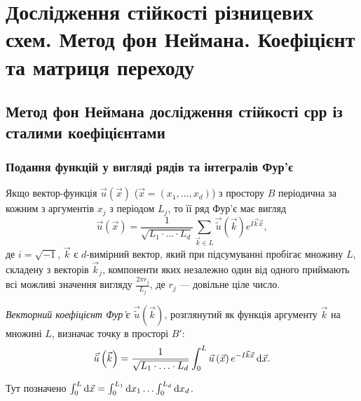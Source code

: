 \chapter{Дослідження стійкості різницевих схем.  Метод фон Неймана.  Коефіцієнт та матриця переходу}


\section{Метод фон Неймана дослідження стійкості срр із сталими коефіцієнтами}

\subsection{Подання функцій у вигляді рядів та інтегралів Фур'є}

Якщо вектор-функція $\vec u \left( \vec x \right)$ ($\vec x = (x_1, \ldots, x_d)$) з простору $B$ періодична за кожним з аргументів $x_j$ з періодом $L_j$, то її ряд Фур'є має вигляд
\begin{equation}
    \label{eq:4.1}
    \vec u \left( \vec x \right) = \frac{1}{\sqrt{L_1 \cdot \ldots \cdot L_d}} \sum_{\vec k \in L} \vec{\tilde{u}} \left( \vec k \right) e^{I \vec k \vec x},
\end{equation}
де $i = \sqrt{-1}$, $\vec k$ є $d$-вимірний вектор, який при підсумуванні пробігає множину $L$, складену з векторів $\vec k_j$, компоненти яких незалежно один від одного приймають всі можливі значення вигляду $\frac{2 \pi r_j}{L_j}$, де $r_j$ --- довільне ціле число.

\begin{definition}
	\emph{Векторний коефіцієнт Фур'є} $\vec{\tilde{u}} \left( \vec k \right)$, розглянутий як функція аргументу $\vec k$ на множині $L$, визначає точку в просторі $B'$:
    \begin{equation}
        \label{eq:4.2}
        \vec{\tilde{u}} \left( \vec k \right) = \frac{1}{\sqrt{L_1 \cdot \ldots \cdot L_d}} \int_0^L \vec u \left( \vec x \right) e^{-I \vec k \vec x} \diff \vec x.
    \end{equation}

    Тут позначено $\int_0^L \diff \vec x = \int_0^{L_1} \diff x_1 \ldots \int_0^{L_d} \diff x_d$.
\end{definition}

